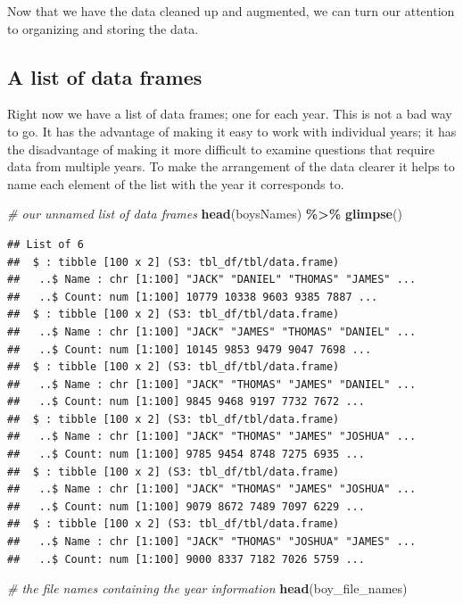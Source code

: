 \documentclass[
]{book}
\newenvironment{Shaded}{\begin{snugshade}}{\end{snugshade}}
\newcommand{\CommentTok}[1]{\textcolor[rgb]{0.56,0.35,0.01}{\textit{#1}}}
\newcommand{\KeywordTok}[1]{\textcolor[rgb]{0.13,0.29,0.53}{\textbf{#1}}}
\newcommand{\NormalTok}[1]{#1}
\newcommand{\OperatorTok}[1]{\textcolor[rgb]{0.81,0.36,0.00}{\textbf{#1}}}
\newcommand{\StringTok}[1]{\textcolor[rgb]{0.31,0.60,0.02}{#1}}
\begin{document}
Now that we have the data cleaned up and augmented, we can turn our attention to organizing and storing the data.

\hypertarget{a-list-of-data-frames}{%
\subsection{A list of data frames}\label{a-list-of-data-frames}}

Right now we have a list of data frames; one for each year. This is not a bad way to go. It has the advantage of making it easy to work with individual years; it has the disadvantage of making it more difficult to examine questions that require data from multiple years. To make the arrangement of the data clearer it helps to name each element of the list with the year it corresponds to.

\begin{Shaded}
\begin{Highlighting}[]
\CommentTok{\# our unnamed list of data frames}
\KeywordTok{head}\NormalTok{(boysNames) }\OperatorTok{\%\textgreater{}\%}\StringTok{ }\KeywordTok{glimpse}\NormalTok{()}
\end{Highlighting}
\end{Shaded}

\begin{verbatim}
## List of 6
##  $ : tibble [100 x 2] (S3: tbl_df/tbl/data.frame)
##   ..$ Name : chr [1:100] "JACK" "DANIEL" "THOMAS" "JAMES" ...
##   ..$ Count: num [1:100] 10779 10338 9603 9385 7887 ...
##  $ : tibble [100 x 2] (S3: tbl_df/tbl/data.frame)
##   ..$ Name : chr [1:100] "JACK" "JAMES" "THOMAS" "DANIEL" ...
##   ..$ Count: num [1:100] 10145 9853 9479 9047 7698 ...
##  $ : tibble [100 x 2] (S3: tbl_df/tbl/data.frame)
##   ..$ Name : chr [1:100] "JACK" "THOMAS" "JAMES" "DANIEL" ...
##   ..$ Count: num [1:100] 9845 9468 9197 7732 7672 ...
##  $ : tibble [100 x 2] (S3: tbl_df/tbl/data.frame)
##   ..$ Name : chr [1:100] "JACK" "THOMAS" "JAMES" "JOSHUA" ...
##   ..$ Count: num [1:100] 9785 9454 8748 7275 6935 ...
##  $ : tibble [100 x 2] (S3: tbl_df/tbl/data.frame)
##   ..$ Name : chr [1:100] "JACK" "THOMAS" "JAMES" "JOSHUA" ...
##   ..$ Count: num [1:100] 9079 8672 7489 7097 6229 ...
##  $ : tibble [100 x 2] (S3: tbl_df/tbl/data.frame)
##   ..$ Name : chr [1:100] "JACK" "THOMAS" "JOSHUA" "JAMES" ...
##   ..$ Count: num [1:100] 9000 8337 7182 7026 5759 ...
\end{verbatim}

\begin{Shaded}
\begin{Highlighting}[]
\CommentTok{\# the file names containing the \textquotesingle{}year\textquotesingle{} information}
\KeywordTok{head}\NormalTok{(boy\_file\_names)}
\end{Highlighting}
\end{Shaded}
\end{document}
